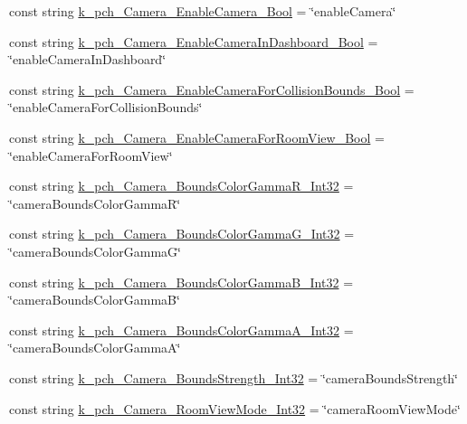 \begin{DoxyCompactItemize}
\item 
const string \mbox{\hyperlink{class_valve_1_1_v_r_1_1_open_v_r_a3dd3134b90e1469e6c1197493c0a10ad}{k\+\_\+pch\+\_\+\+Camera\+\_\+\+Enable\+Camera\+\_\+\+Bool}} = \char`\"{}enable\+Camera\char`\"{}
\item 
const string \mbox{\hyperlink{class_valve_1_1_v_r_1_1_open_v_r_a78bfa51468eb096d86c05db2b03f9470}{k\+\_\+pch\+\_\+\+Camera\+\_\+\+Enable\+Camera\+In\+Dashboard\+\_\+\+Bool}} = \char`\"{}enable\+Camera\+In\+Dashboard\char`\"{}
\item 
const string \mbox{\hyperlink{class_valve_1_1_v_r_1_1_open_v_r_a7a6adced5762270d7df0d8477e4f4ffd}{k\+\_\+pch\+\_\+\+Camera\+\_\+\+Enable\+Camera\+For\+Collision\+Bounds\+\_\+\+Bool}} = \char`\"{}enable\+Camera\+For\+Collision\+Bounds\char`\"{}
\item 
const string \mbox{\hyperlink{class_valve_1_1_v_r_1_1_open_v_r_ac042bdc0ebb4ed8227d4d258fafa7789}{k\+\_\+pch\+\_\+\+Camera\+\_\+\+Enable\+Camera\+For\+Room\+View\+\_\+\+Bool}} = \char`\"{}enable\+Camera\+For\+Room\+View\char`\"{}
\item 
const string \mbox{\hyperlink{class_valve_1_1_v_r_1_1_open_v_r_a30e006c9b8646cc4f3830905431542b5}{k\+\_\+pch\+\_\+\+Camera\+\_\+\+Bounds\+Color\+Gamma\+R\+\_\+\+Int32}} = \char`\"{}camera\+Bounds\+Color\+GammaR\char`\"{}
\item 
const string \mbox{\hyperlink{class_valve_1_1_v_r_1_1_open_v_r_a348c3554f366908b0cd2ad08836c304a}{k\+\_\+pch\+\_\+\+Camera\+\_\+\+Bounds\+Color\+Gamma\+G\+\_\+\+Int32}} = \char`\"{}camera\+Bounds\+Color\+GammaG\char`\"{}
\item 
const string \mbox{\hyperlink{class_valve_1_1_v_r_1_1_open_v_r_a04d7df98011113e64d705f71e62fa87b}{k\+\_\+pch\+\_\+\+Camera\+\_\+\+Bounds\+Color\+Gamma\+B\+\_\+\+Int32}} = \char`\"{}camera\+Bounds\+Color\+GammaB\char`\"{}
\item 
const string \mbox{\hyperlink{class_valve_1_1_v_r_1_1_open_v_r_afa1d38f62625479ad9fff4c42423444d}{k\+\_\+pch\+\_\+\+Camera\+\_\+\+Bounds\+Color\+Gamma\+A\+\_\+\+Int32}} = \char`\"{}camera\+Bounds\+Color\+GammaA\char`\"{}
\item 
const string \mbox{\hyperlink{class_valve_1_1_v_r_1_1_open_v_r_a9b173500ce40ff5752984f7364224142}{k\+\_\+pch\+\_\+\+Camera\+\_\+\+Bounds\+Strength\+\_\+\+Int32}} = \char`\"{}camera\+Bounds\+Strength\char`\"{}
\item 
const string \mbox{\hyperlink{class_valve_1_1_v_r_1_1_open_v_r_ae9f2b7e48b6225f6f5f57f43f0f37fe8}{k\+\_\+pch\+\_\+\+Camera\+\_\+\+Room\+View\+Mode\+\_\+\+Int32}} = \char`\"{}camera\+Room\+View\+Mode\char`\"{}

\end{DoxyCompactItemize}

